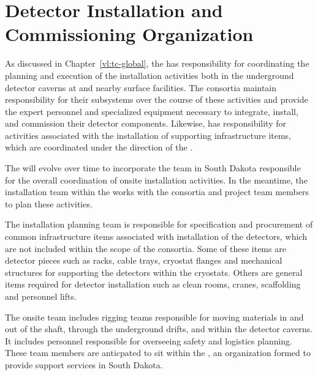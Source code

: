 \chapter{Detector Installation and Commissioning Organization}
\label{ch:tc-jpo}


As discussed in Chapter~\ref{vl:tc-global}, the  has
responsibility for coordinating the planning and execution of 
the  installation activities both 
in the underground detector caverns at  and 
nearby surface facilities.  The  consortia maintain 
responsibility for their subsystems over the course of these 
activities and provide the expert personnel and specialized 
equipment necessary to integrate, install, and commission their 
detector components.  Likewise,  has responsibility 
for activities associated with the installation 
of supporting infrastructure items, which are coordinated under 
the direction of the .       

The  will evolve over time to incorporate the team in South 
Dakota responsible for the overall coordination of onsite
installation activities.  In the meantime, the installation team 
within the  works with the  consortia 
and  project team members to plan these activities.  

The  installation planning team is 
responsible for specification and procurement of common infrastructure 
items associated with installation of the detectors, 
which are not included within the scope of the  consortia.  
Some of these items are detector pieces such as racks, cable trays, cryostat 
flanges and mechanical structures for supporting the detectors within 
the cryostats.  Others are general items required for detector
installation such as clean rooms, cranes, scaffolding and personnel 
lifts.

The onsite  team includes rigging 
teams responsible for moving materials in and out of the shaft, through the 
underground drifts, and within the detector caverns.  It includes
personnel responsible for overseeing safety and logistics planning.  These 
team members are anticpated to sit within the , an organization 
formed to provide  support services in South Dakota.    

